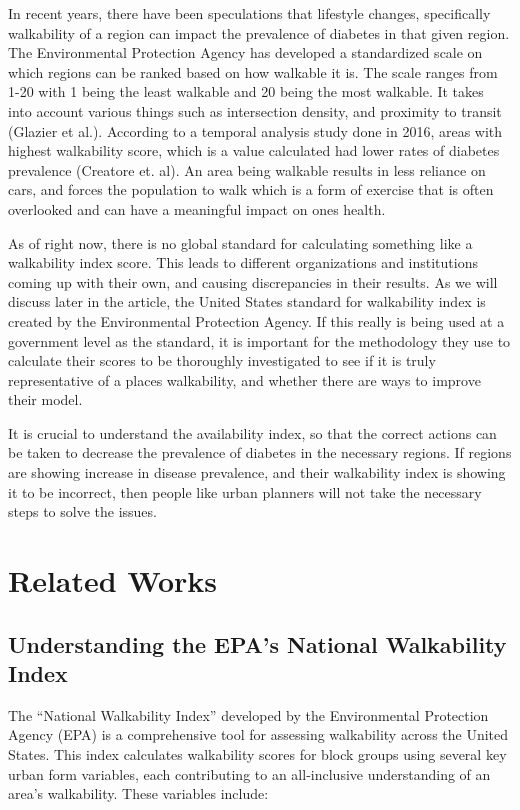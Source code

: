 \documentclass[
]{article}
\begin{document}
In recent years, there have been speculations that lifestyle changes,
specifically walkability of a region can impact the prevalence of
diabetes in that given region. The Environmental Protection Agency has
developed a standardized scale on which regions can be ranked based on
how walkable it is. The scale ranges from 1-20 with 1 being the least
walkable and 20 being the most walkable. It takes into account various
things such as intersection density, and proximity to transit (Glazier
et al.). According to a temporal analysis study done in 2016, areas with
highest walkability score, which is a value calculated had lower rates
of diabetes prevalence (Creatore et. al). An area being walkable results
in less reliance on cars, and forces the population to walk which is a
form of exercise that is often overlooked and can have a meaningful
impact on ones health.

As of right now, there is no global standard for calculating something
like a walkability index score. This leads to different organizations
and institutions coming up with their own, and causing discrepancies in
their results. As we will discuss later in the article, the United
States standard for walkability index is created by the Environmental
Protection Agency. If this really is being used at a government level as
the standard, it is important for the methodology they use to calculate
their scores to be thoroughly investigated to see if it is truly
representative of a places walkability, and whether there are ways to
improve their model.

It is crucial to understand the availability index, so that the correct
actions can be taken to decrease the prevalence of diabetes in the
necessary regions. If regions are showing increase in disease
prevalence, and their walkability index is showing it to be incorrect,
then people like urban planners will not take the necessary steps to
solve the issues.

\section{Related Works}\label{related-works}

\subsection{Understanding the EPA's National Walkability
Index}\label{understanding-the-epas-national-walkability-index}

The ``National Walkability Index'' developed by the Environmental
Protection Agency (EPA) is a comprehensive tool for assessing
walkability across the United States. This index calculates walkability
scores for block groups using several key urban form variables, each
contributing to an all-inclusive understanding of an area's walkability.
These variables include:
\end{document}
